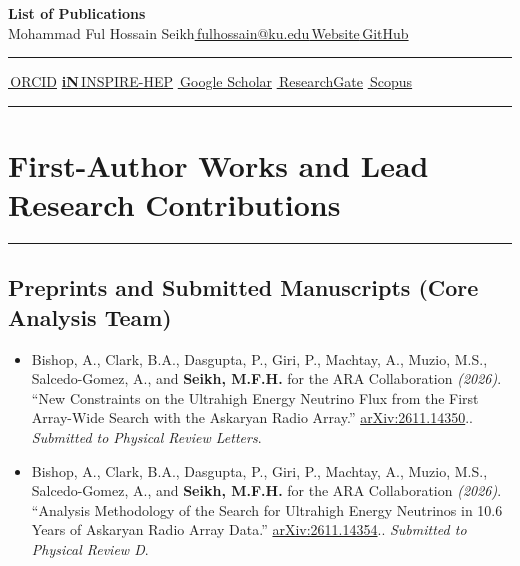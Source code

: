 \documentclass[10pt]{article}
\newcommand{\arxiv}[1]{\href{https://arxiv.org/abs/#1}{arXiv:#1}.}
\newcommand{\profilelink}[3]{\href{#1}{#2\,#3}}
\begin{document}
\pagestyle{plain}

\begin{center}
    {\LARGE\bfseries List of Publications}\\[5pt]
    {\large Mohammad Ful Hossain Seikh}\enspace\textbar\enspace\profilelink{mailto:fulhossain@ku.edu}{\faEnvelope}{fulhossain@ku.edu}\enspace\textbar\enspace\profilelink{https://mohammad-neutrino.github.io/}{\faGlobe}{Website}\enspace\textbar\enspace\profilelink{https://github.com/Mohammad-Neutrino}{\faGithub}{GitHub}\\[6pt]

    \vspace{3pt}
    \hrule
    \vspace{0pt}

    \small

    \profilelink{https://orcid.org/0000-0002-4464-7354}{\aiOrcid}{ORCID}
    \quad
    \profilelink{https://inspirehep.net/authors/2014116}{{\sffamily\bfseries iN}}{INSPIRE-HEP}
    \quad
    \profilelink{https://scholar.google.com/citations?user=dSwfpWQAAAAJ}{\aiGoogleScholar}{Google Scholar}
    \quad
    \profilelink{https://www.researchgate.net/profile/Mohammad-Ful-Hossain-Seikh}{\aiResearchGate}{ResearchGate}
    \quad
    \profilelink{https://www.scopus.com/authid/detail.uri?authorId=57426893600}{\aiScopus}{Scopus}
\end{center}

\vspace{3pt}
\hrule
\vspace{4pt}

\section{First-Author Works and Lead Research Contributions}
\vspace{3pt}
\hrule
\vspace{4pt}

\subsection{Preprints and Submitted Manuscripts (Core Analysis Team)}
\begin{itemize}
    \item Bishop, A., Clark, B.A., Dasgupta, P., Giri, P., Machtay, A., Muzio, M.S., Salcedo-Gomez, A., and \textbf{Seikh, M.F.H.} for the ARA Collaboration \textit{(2026)}. ``New Constraints on the Ultrahigh Energy Neutrino Flux from the First Array-Wide Search with the Askaryan Radio Array.'' \arxiv{2611.14350}. \textit{Submitted to Physical Review Letters}.
    \item Bishop, A., Clark, B.A., Dasgupta, P., Giri, P., Machtay, A., Muzio, M.S., Salcedo-Gomez, A., and \textbf{Seikh, M.F.H.} for the ARA Collaboration \textit{(2026)}. ``Analysis Methodology of the Search for Ultrahigh Energy Neutrinos in 10.6 Years of Askaryan Radio Array Data.'' \arxiv{2611.14354}. \textit{Submitted to Physical Review D}.
\end{itemize}
\end{document}
